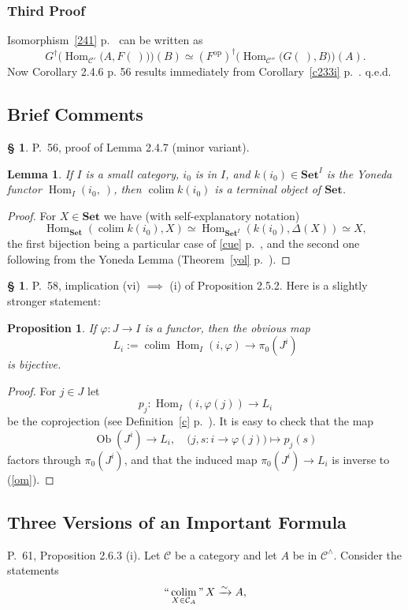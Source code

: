 \documentclass[12pt]{article}
\newtheorem{lem}[thm]{Lemma}
\newtheorem{prop}[thm]{Proposition}
\theoremstyle{remark}
\theoremstyle{definition}
\newtheorem{s}[thm]{\S}
\newcommand{\C}{\mathcal C}
\newcommand{\Set}{\mathbf{Set}}
\newcommand{\mv}{ (minor variant)}
\newcommand{\bc}{\subsection{Brief Comments}}
\DeclareMathOperator*{\coli}{colim}
\DeclareMathOperator*{\ic}{``\coli"}
\DeclareMathOperator{\Hom}{Hom}%
\DeclareMathOperator{\Ob}{Ob}
\DeclareMathOperator{\op}{op}
\begin{document}
\subsubsection{Third Proof}
%
Isomorphism~\eqref{241} p.~\pageref{241} can be written as 
$$
G^\dagger\Big(\Hom_{\C'}\big(A,F(\ )\big)\Big)(B)\simeq
(F^{\op})^\dagger\Big(\Hom_{\C''}\big(G(\ ),B\big)\Big)(A).
$$ 
Now Corollary 2.4.6 p. 56 results immediately from Corollary~\ref{c233i} p.~\pageref{c233i}. q.e.d.
%
%
\bc
%
\begin{s} 
P.~56, proof of Lemma 2.4.7\mv.
%
\begin{lem} 
If $I$ is a small category, $i_0$ is in $I$, and $k(i_0)\in\Set^I$ is the Yoneda functor $\Hom_I(i_0,\ )$, then $\coli k(i_0)$ is a terminal object of $\Set$. 
\end{lem}
%
\begin{proof}
For $X\in\Set$ we have (with self-explanatory notation)
$$
\Hom_{\Set}\left(\coli k(i_0),X\right)\simeq\Hom_{{\Set}^I}(k(i_0),\Delta(X))\simeq X,
$$
the first bijection being a particular case of \eqref{cue} p.~\pageref{cue}, and the second one following from the Yoneda Lemma (Theorem~\ref{yol} p.~\pageref{yol}).
\end{proof}
\end{s}
%
%
\begin{s} 
P.~58, implication (vi) $\implies$ (i) of Proposition 2.5.2. Here is a slightly stronger statement:
%
\begin{prop} 
If $\varphi:J\to I$ is a functor, then the obvious map
\begin{equation}\label{om}
L_i:=\coli\Hom_I(i,\varphi)\to\pi_0(J^i)
\end{equation}
is bijective. 
\end{prop}
% 
\begin{proof}
For $j\in J$ let 
$$
p_j:\Hom_I(i,\varphi(j))\to L_i
$$
be the coprojection (see Definition~\ref{c} p.~\pageref{c}). It is easy to check that the map 
$$
\Ob(J^i)\to L_i,\quad\big(j,s:i\to\varphi(j)\big)\mapsto p_j(s)
$$
factors through $\pi_0(J^i)$, and that the induced map $\pi_0(J^i)\to L_i$ is inverse to (\ref{om}).
\end{proof}
\end{s}
%
%
\subsection{Three Versions of an Important Formula}
%
P.~61, Proposition 2.6.3 (i). Let $\C$ be a category and let $A$ be in $\C^\wedge$. Consider the statements
%
\begin{equation}\label{263a}
\ic_{X\in\C_A}X\xrightarrow\sim A,
\end{equation} 
\end{document}
